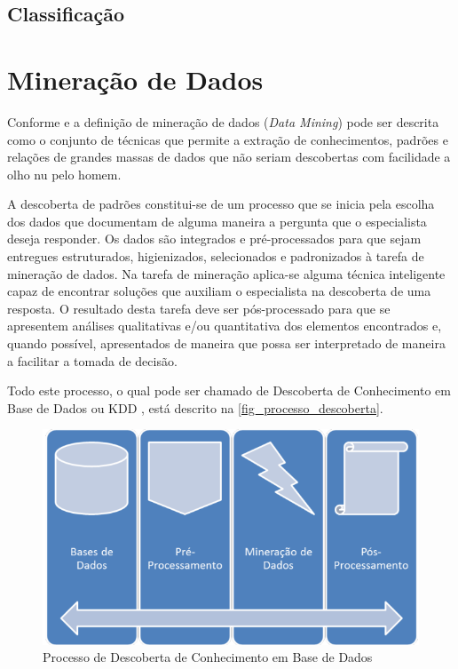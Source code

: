 \documentclass[
	12pt,				%
	openright,			%
	twoside,			%
	a4paper,			%
	english,			%
	french,				%
	spanish,			%
	brazil				%
	]{abntex2}
\begin{document}
\subsection{Classificação}
\section{Mineração de Dados}
Conforme  e   a definição de mineração de dados (\emph{Data Mining}) pode ser descrita como o conjunto de técnicas que permite a extração de conhecimentos, padrões e relações de grandes massas de dados que não seriam descobertas com facilidade a olho nu pelo homem.

A descoberta de padrões constitui-se de um processo que se inicia pela escolha dos dados que documentam de alguma maneira a pergunta que o especialista deseja responder. Os dados são integrados e pré-processados para que sejam entregues estruturados, higienizados, selecionados e padronizados à tarefa de mineração de dados. Na tarefa de mineração aplica-se alguma técnica inteligente capaz de encontrar soluções que auxiliam o especialista na descoberta de uma resposta. O resultado desta tarefa deve ser pós-processado para que se apresentem análises qualitativas e/ou quantitativa dos elementos encontrados e, quando possível, apresentados de maneira que possa ser interpretado de maneira a facilitar a tomada de decisão. \cite[p.569 - p.570]{inproceedings}

Todo este processo, o qual pode ser chamado de Descoberta de Conhecimento em Base de Dados ou KDD , está descrito na \autoref{fig_processo_descoberta}.

\begin{figure}[htb]
	\caption{\label{fig_processo_descoberta}Processo de Descoberta de Conhecimento em Base de Dados}
	\begin{center}
	    \includegraphics[scale=0.4]{imagens/Processo_de_descoberta_de_conhecimento_em_base_de_dados.pdf}
	\end{center}
\end{figure}
\end{document}
